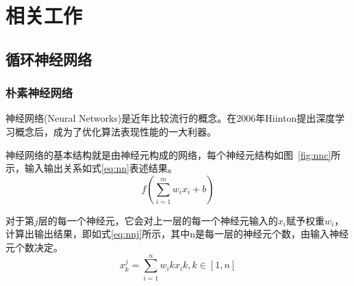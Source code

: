 \section{相关工作}

\subsection{循环神经网络}
\subsubsection{朴素神经网络}
神经网络(Neural Networks)是近年比较流行的概念。在2006年Hiinton提出深度学习概念后，成为了优化算法表现性能的一大利器。

神经网络的基本结构就是由神经元构成的网络，每个神经元结构如图~\ref{fig:nnc}所示，输入输出关系如式\eqref{eq:nn}表述结果。
\begin{equation}
    \label{eq:nn}
    f( \sum\limits_{i=1}^{m} w_i x_i + b ) 
\end{equation}

对于第$j$层的每一个神经元，它会对上一层的每一个神经元输入的$x_i$赋予权重$w_i$，计算出输出结果，即如式\eqref{eq:nnj}所示，其中n是每一层的神经元个数，由输入神经元个数决定。
\begin{equation}
    \label{eq:nnj}
    x_k^j = \sum\limits_{i=1}^{n} w_ik x_ik, k\in \left[1,n\right]
\end{equation}

